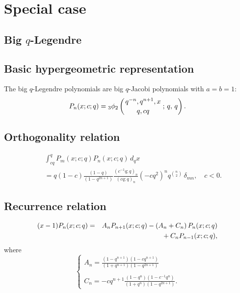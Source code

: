 \documentclass[envcountchap,graybox]{svmono}
\newcommand{\qhyp}[5]{\mbox{}_{#1}{\phi}_{#2}
\left(\genfrac{}{}{0pt}{}{#3}{#4}\,;\,q,\,#5\right)}
\newcommand{\mathindent}{\hspace{7.5mm}}
\begin{document}
\section*{Special case}

\subsection{Big $q$-Legendre}
\par

\subsection*{Basic hypergeometric representation} The big $q$-Legendre polynomials are big $q$-Jacobi polynomials
with $a=b=1$:
\begin{equation}
\label{DefBigqLegendre}
P_n(x;c;q)=\qhyp{3}{2}{q^{-n},q^{n+1},x}{q,cq}{q}.
\end{equation}

\subsection*{Orthogonality relation}
\begin{eqnarray}
\label{OrtBigqLegendre}
& &\int_{cq}^{q}P_m(x;c;q)P_n(x;c;q)\,d_qx\nonumber\\
& &{}=q(1-c)\frac{(1-q)}{(1-q^{2n+1})}
\frac{(c^{-1}q;q)_n}{(cq;q)_n}(-cq^2)^nq^{\binom{n}{2}}\,\delta_{mn},\quad c<0.
\end{eqnarray}

\subsection*{Recurrence relation}
\begin{eqnarray}
\label{RecBigqLegendre}
(x-1)P_n(x;c;q)&=&A_nP_{n+1}(x;c;q)-\left(A_n+C_n\right)P_n(x;c;q)\nonumber\\
& &{}\mathindent{}+C_nP_{n-1}(x;c;q),
\end{eqnarray}
where
$$\left\{\begin{array}{l}
\displaystyle A_n=\frac{(1-q^{n+1})(1-cq^{n+1})}{(1+q^{n+1})(1-q^{2n+1})}\\
\\
\displaystyle C_n=-cq^{n+1}\frac{(1-q^n)(1-c^{-1}q^n)}{(1+q^n)(1-q^{2n+1})}.
\end{array}\right.$$
\end{document}
